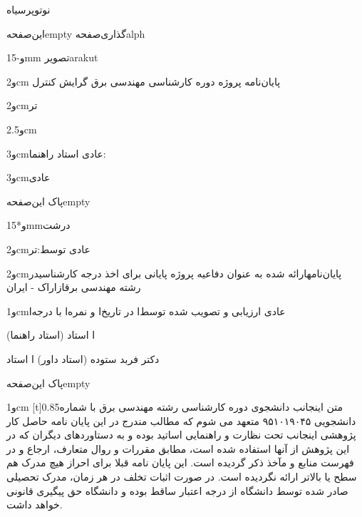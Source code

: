 ‌نو{توپر}{‌سیاه}{}

‌این‌صفحه{empty}
‌گذاری‌صفحه{alph}‬


\onehalfspacing

‌و{-15mm}
‌تصویر{arakut}

\departfa

‌و{2cm} پایان‌نامه پروژه دوره کارشناسی مهندسی برق گرایش کنترل

‌و{2cm}‌تر\titlefa

‌و{2.5cm}\authorfa

‌و{3cm}‌عادی استاد راهنما: \supervisorfa

‌و{3cm}‌عادی\datefa


‌پاک
‌این‌صفحه{empty}


‌و*{15mm}‌درشت\titlefa

‌و{2cm}‌عادی توسط:‌تر\authorfa

‌و{2cm} پایان‌نامه ارائه شده به عنوان دفاعیه پروژه پایانی برای اخذ درجه کارشناسی در رشته مهندسی برق از \instfa{} اراک - ایران

\doublespacing

‌و{1cm}‌عادی ارزیابی و تصویب شده
توسط‌ا{} در تاریخ‌ا{} و نمره‌ا{} با درجه‌ا{}

\supervisorfa
(استاد راهنما) ‌ا
استاد \instfa

دکتر فربد ستوده
(استاد داور) ‌ا
استاد \instfa


‌پاک
‌این‌صفحه{empty}


‌و{1cm}
[t]{0.85‌متن}
\onehalfspacing
اینجانب \authorfa{} دانشجوی دوره کارشناسی رشته مهندسی برق با شماره دانشجویی ۹۵۱۰۱۹۰۴۵ متعهد می شوم که مطالب مندرج در این پايان نامه حاصل کار پژوهشی اینجانب تحت نظارت و راهنمایی اساتید \instfa بوده و به دستاوردهای دیگران که در این پژوهش از آنها استفاده شده است، مطابق مقررات و روال متعارف، ارجاع و در فهرست منابع و مآخذ ذکر گردیده است. این پايان نامه  قبلا برای احراز هیچ مدرک هم سطح یا بالاتر ارائه نگردیده است. در صورت اثبات تخلف در هر زمان، مدرک تحصیلی صادر شده توسط دانشگاه از درجه اعتبار ساقط بوده و دانشگاه حق پیگیری قانونی خواهد داشت.

